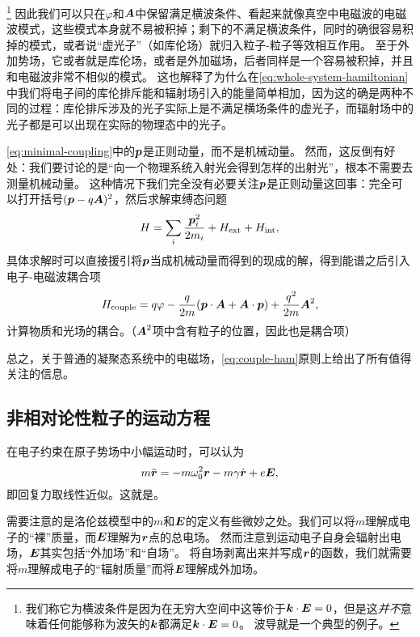 \footnote{
    我们称它为横波条件是因为在无穷大空间中这等价于$\vb*{k} \cdot \vb*{E} = 0$，但是这\emph{并不}意味着任何能够称为波矢的$\vb*{k}$都满足$\vb*{k} \cdot \vb*{E} = 0$。
    波导就是一个典型的例子。
}%
因此我们可以只在$\varphi$和$\vb*{A}$中保留满足横波条件、看起来就像真空中电磁波的电磁波模式，这些模式本身就不易被积掉；剩下的不满足横波条件，同时的确很容易积掉的模式，或者说“虚光子”（如库伦场）就归入粒子-粒子等效相互作用。
至于外加势场，它或者就是库伦场，或者是外加磁场，后者同样是一个容易被积掉，并且和电磁波非常不相似的模式。
这也解释了为什么在\eqref{eq:whole-system-hamiltonian}中我们将电子间的库伦排斥能和辐射场引入的能量简单相加，因为这的确是两种不同的过程：库伦排斥涉及的光子实际上是不满足横场条件的虚光子，而辐射场中的光子都是可以出现在实际的物理态中的光子。

\eqref{eq:minimal-coupling}中的$\vb*{p}$是正则动量，而不是机械动量。
然而，这反倒有好处：我们要讨论的是“向一个物理系统入射光会得到怎样的出射光”，根本不需要去测量机械动量。
这种情况下我们完全没有必要关注$\vb*{p}$是正则动量这回事：完全可以打开括号$(\vb*{p} - q \vb*{A})^2$，然后求解束缚态问题
\begin{equation}
    H = \sum_i \frac{\vb*{p}_i^2}{2m_i} + H_\text{ext} + H_\text{int},
    \label{eq:levels-ham}
\end{equation}
具体求解时可以直接援引将$\vb*{p}$当成机械动量而得到的现成的解，得到能谱之后引入电子-电磁波耦合项
\begin{equation}
    H_\text{couple} = q \varphi - \frac{q}{2m} (\vb*{p} \cdot \vb*{A} + \vb*{A} \cdot \vb*{p}) + \frac{q^2}{2m} \vb*{A}^2,
    \label{eq:couple-ham}
\end{equation}
计算物质和光场的耦合。（$\vb*{A}^2$项中含有粒子的位置，因此也是耦合项）

总之，关于普通的凝聚态系统中的电磁场，\eqref{eq:couple-ham}原则上给出了所有值得关注的信息。

\subsection{非相对论性粒子的运动方程}\label{sec:non-relativity-particles-eom}

在电子约束在原子势场中小幅运动时，可以认为
\begin{equation}
    m \ddot{\vb*{r}} = - m \omega_0^2 \vb*{r} - m \gamma \dot{\vb*{r}} + e \vb*{E},
\end{equation}
即回复力取线性近似。这就是。

需要注意的是洛伦兹模型中的$m$和$\vb*{E}$的定义有些微妙之处。我们可以将$m$理解成电子的“裸”质量，而$\vb*{E}$理解为$\vb*{r}$点的总电场。
然而注意到运动电子自身会辐射出电场，$\vb*{E}$其实包括“外加场”和“自场”。
将自场剥离出来并写成$\vb*{r}$的函数，我们就需要将$m$理解成电子的“辐射质量”而将$\vb*{E}$理解成外加场。

